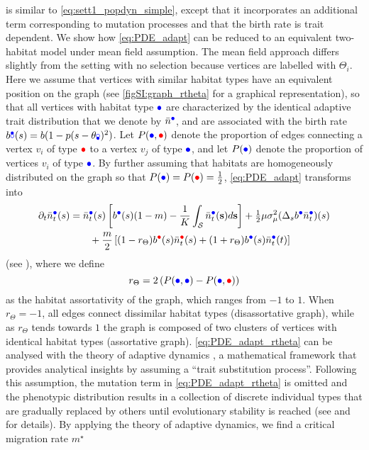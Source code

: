  is similar to \cref{eq:sett1_popdyn_simple}, except that it incorporates an additional term corresponding to mutation processes and that the birth rate is trait dependent.
%
We show how \cref{eq:PDE_adapt} can be reduced to an equivalent two-habitat model under mean field assumption. 
%
The mean field approach differs slightly from the setting with no selection because vertices are labelled with $\Theta_i$. Here we assume that vertices with similar habitat types have an equivalent position on the graph (see \cref{figSI:graph_rtheta} for a graphical representation), so that all vertices with habitat type $\bcirc$ are characterized by the identical adaptive trait distribution that we denote by $\bar{n}^{{\bcirc}}$, and are associated with the birth rate $b^\bcirc(s) = b(1 - p(s - \theta_\bcirc)^2)$. Let $P({\bcirc},{\rcirc})$ denote the proportion of edges connecting a vertex $v_i$ of type $\rcirc$ to a vertex $v_j$ of type $\bcirc$, and let $P(\bcirc)$ denote the proportion of vertices $v_i$ of type $\bcirc$. 
%
By further assuming that habitats are homogeneously distributed on the graph so that $P({\bcirc}) = P({\rcirc}) = \tfrac{1}{2}$, \cref{eq:PDE_adapt} transforms into
\begin{equation}\label{eq:PDE_adapt_rtheta}
  \begin{split}
    \partial_t \bar{n}_t^{{\bcirc}}(s) &= \bar{n}_t^{{\bcirc}}(s)\left[ b^{{\bcirc}}(s) (1-m) - \frac{1}{K}\int_\mathcal{S}  \bar{n}_t^{{\bcirc}}({\textbf s}) d{\textbf s} \right] + \tfrac{1}{2} \mu \sigma_\mu^2 (\Delta_s b^{{\bcirc}} \bar{n}_t^{{\bcirc}})(s) \\
    & \qquad + \frac{m}{2} \, [ (1-r_\Theta)  b^{{\rcirc}}(s) \bar{n}_t^{{\rcirc}}(s) + (1 + r_\Theta)  b^{{\bcirc}}(s) \bar{n}_t^{{\bcirc}}(t)]\\
  \end{split}
\end{equation}
%
(see ), where we define
\begin{equation}\label{eq:r_theta_mf}
  r_\Theta = 2 \left( P({\bcirc},{\bcirc}) - P({\bcirc},{\rcirc}) \right)
\end{equation} 
as the habitat assortativity of the graph, which ranges from $-1$ to $1$.
%
When $r_\Theta = -1$, all edges connect dissimilar habitat types (disassortative graph), while as $r_\Theta$ tends towards $1$ the graph is composed of two clusters of vertices with identical habitat types (assortative graph).
%
\cref{eq:PDE_adapt_rtheta} can be analysed with the theory of adaptive dynamics \citep{Meszena1997,Debarre2013,Mirrahimi2020}, a mathematical framework that provides analytical insights by assuming a “trait substitution process”. Following this assumption, the mutation term in \cref{eq:PDE_adapt_rtheta} is omitted and the phenotypic distribution results in a collection of discrete individual types that are gradually replaced by others until evolutionary stability is reached (see  and \citep{Meszena1997,Debarre2013,Mirrahimi2020} for details). By applying the theory of adaptive dynamics, we find a critical migration rate $m^\star$
